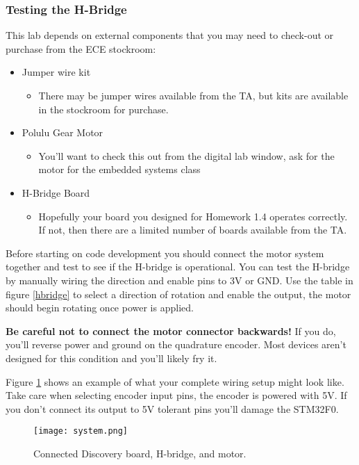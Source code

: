 \documentclass[openany,11pt,fleqn]{book} %
\begin{document}
\subsubsection{Testing the H-Bridge}
This lab depends on external components that you may need to check-out or purchase from the ECE stockroom:
\begin{itemize}
    \item Jumper wire kit
    \begin{itemize}
        \item There may be jumper wires available from the TA, but kits are available in the stockroom for purchase.
    \end{itemize}
    \item Polulu Gear Motor 
    \begin{itemize}
        \item You'll want to check this out from the digital lab window, ask for the motor for the embedded systems class
    \end{itemize}
    \item H-Bridge Board
    \begin{itemize}
        \item Hopefully your board you designed for Homework 1.4 operates correctly. If not, then there are a limited number of boards available from the TA.
    \end{itemize}
\end{itemize}
Before starting on code development you should connect the motor system together and test to see if the H-bridge is operational. You can test the H-bridge by manually wiring the direction and enable pins to 3V or GND. Use the table in figure \ref{hbridge} to select a direction of rotation and enable the output, the motor should begin rotating once power is applied. 

\begin{warning}
    \textbf{Be careful not to connect the motor connector backwards!} If you do, you'll reverse power and ground on the quadrature encoder. Most devices aren't designed for this condition and you'll likely fry it.
\end{warning}
Figure \ref{system} shows an example of what your complete wiring setup might look like. Take care when selecting encoder input pins, the encoder is powered with 5V. If you don't connect its output to 5V tolerant pins you'll damage the STM32F0.

\begin{figure}[tb]
    \centering\texttt{[image: system.png]}
    \caption{Connected Discovery board, H-bridge, and motor.}
    \label{system}
\end{figure}
\end{document}
